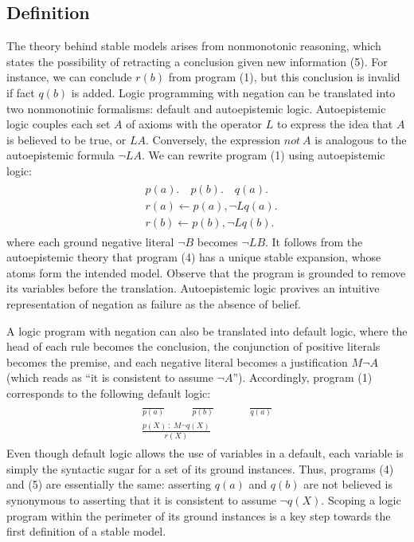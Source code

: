 \subsection{Definition}
The theory behind stable models arises from nonmonotonic reasoning, which states the possibility 
of retracting a conclusion given new information (5). For instance, we can conclude $r(b)$ from 
program (1), but this conclusion is invalid if fact $q(b)$ is added. Logic programming with 
negation can be translated into two nonmonotinic formalisms: default and autoepistemic logic. 
Autoepistemic logic couples each set $A$ of axioms with the operator $L$ to express the idea that 
$A$ is believed to be true, or $LA$. Conversely, the expression $not \: A$ is analogous to the autoepistemic formula 
$\neg LA$. We can rewrite program (1) using autoepistemic logic:
\begin{align}
    \begin{split}
        & p(a). \hspace{1em} p(b). \hspace{1em} q(a). \\
        & r(a) \leftarrow p(a), \neg Lq(a). \\ 
        & r(b) \leftarrow p(b), \neg Lq(b).
    \end{split}
\end{align}
where each ground negative literal $\neg B$ becomes $\neg LB$. It follows from the 
autoepistemic theory that program (4) has a unique stable expansion, whose atoms 
form the intended model. Observe that the program is 
grounded to remove its variables before the translation. Autoepistemic logic provives an intuitive 
representation of negation as failure as the absence of belief. 

A logic program with negation can also be translated into default logic, where the head 
of each rule becomes the conclusion, the conjunction of positive literals becomes the premise, 
and each negative literal becomes a justification $M \neg A$ (which reads as ``it is consistent to assume $\neg A$''). 
Accordingly, program (1) corresponds to the following default logic:
\begin{align}
    \begin{split}
        \frac{}{p(a)} \hspace{1cm} \frac{}{p(b)} \hspace{1cm} &\frac{}{q(a)} \\ 
        \frac{p(X) \: : \: M \neg q(X)}{r(X)}&
    \end{split}
\end{align}
Even though default logic allows the use of variables in a default, each variable is simply 
the syntactic sugar for a set of its ground instances. Thus, programs (4) and (5) are essentially 
the same: asserting $q(a)$ and $q(b)$ are not believed is synonymous to asserting that it is consistent to assume 
$\neg q(X)$. Scoping a logic program within the perimeter of its ground instances is a key step 
towards the first definition of a stable model. 


